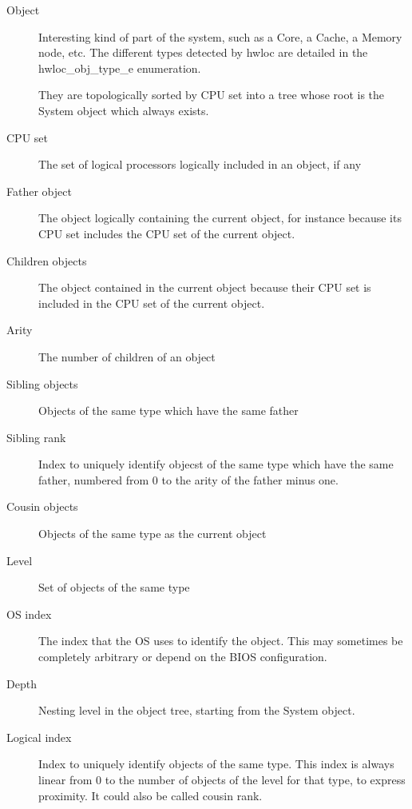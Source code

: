 \begin{description}
\item[Object ]Interesting kind of part of the system, such as a Core, a Cache, a Memory node, etc. The different types detected by hwloc are detailed in the hwloc\_\-obj\_\-type\_\-e enumeration.

They are topologically sorted by CPU set into a tree whose root is the System object which always exists. 

\item[CPU set ]The set of logical processors logically included in an object, if any

\item[Father object ]The object logically containing the current object, for instance because its CPU set includes the CPU set of the current object. 

\item[Children objects ]The object contained in the current object because their CPU set is included in the CPU set of the current object.

\item[Arity ]The number of children of an object

\item[Sibling objects ]Objects of the same type which have the same father

\item[Sibling rank ]Index to uniquely identify objecst of the same type which have the same father, numbered from 0 to the arity of the father minus one.

\item[Cousin objects ]Objects of the same type as the current object

\item[Level ]Set of objects of the same type

\item[OS index ]The index that the OS uses to identify the object. This may sometimes be completely arbitrary or depend on the BIOS configuration.

\item[Depth ]Nesting level in the object tree, starting from the System object.

\item[Logical index ]Index to uniquely identify objects of the same type. This index is always linear from 0 to the number of objects of the level for that type, to express proximity. It could also be called cousin rank.

\end{description}


